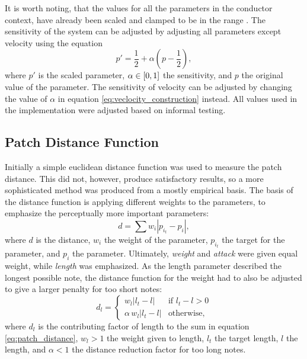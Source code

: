 It is worth noting,
that the values for all the parameters
in the conductor context,
have already been scaled and clamped
to be in the range .
The sensitivity of the system
can be adjusted by adjusting all parameters
except velocity using the equation
\begin{equation}
p' = \dfrac{1}{2} + \alpha \left ( p - \dfrac{1}{2} \right ),
\end{equation}
where $p'$ is the scaled parameter,
$\alpha \in \mathopen[ 0, 1 \mathclose]$ the sensitivity,
and $p$ the original value of the parameter.
The sensitivity of velocity can be adjusted
by changing the value of $\alpha$
in equation \ref{eq:veclocity_construction} instead.
All values used in the implementation were
adjusted based on informal testing.

\subsection{Patch Distance Function}

Initially a simple euclidean distance function
was used to measure the patch distance.
This did not, however, produce satisfactory results,
so a more sophisticated method was
produced from a mostly empirical basis.
The basis of the distance function is applying
different weights to the parameters,
to emphasize the perceptually more important parameters:
\begin{equation}
d = \sum w_i \left \vert p_{i_t} - p_i \right \vert,
\label{eq:patch_distance}
\end{equation}
where $d$ is the distance,
$w_i$ the weight of the \nth[i] parameter,
$p_{i_t}$ the target for the \nth[i] parameter,
and $p_i$ the \nth[i] parameter.
Ultimately, \textit{weight} and \textit{attack}
were given equal weight,
while \textit{length} was emphasized.
As the length parameter described the
longest possible note,
the distance function for the weight had to also be adjusted
to give a larger penalty for too short notes:
\begin{equation}
d_l =
\begin{cases}
w_l \left \vert l_t - l \right \vert & \text{if } l_t - l > 0 \\
\alpha \, w_l \left \vert l_t - l \right \vert & \text{otherwise},
\end{cases}
\end{equation}
where $d_l$ is the contributing factor of length
to the sum in equation \ref{eq:patch_distance},
$w_l > 1$ the weight given to length,
$l_t$ the target length,
$l$ the length,
and $\alpha < 1$ the distance reduction factor for too long notes.


